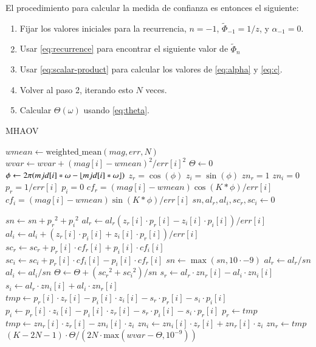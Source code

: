 El procedimiento para calcular la medida de confianza es entonces el siguiente:
\begin{enumerate}
    \item Fijar los valores iniciales para la recurrencia, $n=-1$, $\tilde{\Phi}_{-1} = 1/z$, y $\alpha_{-1}=0$.
    \item Usar \eqref{eq:recurrence} para encontrar el siguiente valor de $\tilde{\Phi}_n$
    \item Usar \eqref{eq:scalar-product} para calcular los valores de \eqref{eq:alpha} y \eqref{eq:c}.
    \item Volver al paso 2, iterando esto $N$ veces.
    \item Calcular $\Theta(\omega)$ usando \ref{eq:theta}.
\end{enumerate}
    
\begin{algorithm}[H]
\caption{MHAOV}\label{alg:mhaov}
\begin{algorithmic}
    \State $wmean \gets \text{weighted\_mean}(mag, err, N)$ 
\State $wvar \gets wvar + (mag[i] - wmean)^{2}/err[i]^{2}$ 
\EndFor
\State $\Theta \gets 0$
    \State $\phi \gets 2 \pi (mjd[i]*\omega - \lfloor mjd[i]*\omega\rfloor)$
    \State $z_r = \cos(\phi)$ 
    \State $z_i = \sin(\phi)$ 
    \State $zn_r = 1$ 
    \State $zn_i = 0$
    \State $p_r = 1/err[i]$
    \State $p_i = 0$
    \State $cf_r = (mag[i] - wmean)\cos(K * \phi) / err[i]$
    \State $cf_i = (mag[i] - wmean)\sin(K * \phi) / err[i]$
\EndFor
{}
    \State $sn, al_r, al_i, sc_r, sc_i \gets 0$

    \State $sn \gets sn + {p_r}^{2}+ {p_i}^{2}  $
    \State $al_r \gets al_r (z_r[i] \cdot  p_r[i] - z_i[i] \cdot  p_i[i])/err[i]$ 
        \State $al_i \gets al_i + ( z_r[i] \cdot  p_i[i] + z_i[i] \cdot  p_r[i])/err[i]$
        \State $sc_r \gets sc_r + p_r[i] \cdot  cf_r[i] + p_i[i] \cdot  cf_i[i]$ 
        \State $sc_i \gets sc_i + p_r[i] \cdot  cf_i[i] - p_i[i] \cdot  cf_r[i]$
    \EndFor
    \State $sn \gets \max(sn, 10\cdot {-9})$
    \State $al_r \gets al_r/sn$
    \State $al_i \gets al_i/sn$
    \State $\Theta \gets \Theta + ({sc_r}^{2} + {sc_i}^{2})/sn$
        \State $s_r \gets al_r \cdot zn_r[i] - al_i \cdot zn_i[i]$
        \State $s_i \gets al_r \cdot zn_i[i] + al_i \cdot zn_r[i]$
        \State $tmp \gets p_r[i]\cdot z_r[i] - p_i[i]\cdot z_i[i] - s_r\cdot p_r[i] - s_i\cdot p_i[i]$
        \State $p_i \gets p_r[i]\cdot z_i[i] - p_i[i]\cdot z_r[i] - s_r\cdot p_i[i] - s_i\cdot p_r[i]$ 
        \State $p_r \gets tmp$
        \State $tmp \gets zn_r[i] \cdot z_r[i] - zn_i[i] \cdot z_i$
        \State $zn_i \gets zn_i[i] \cdot z_r[i] + zn_r[i] \cdot z_i$ 
        \State $zn_r \gets tmp$
    \EndFor
\EndFor
\State \Return $(K-2N-1)\cdot \Theta / (2N\cdot \text{max}(wvar - \Theta, 10^{-9}))$


\end{algorithmic}
\end{algorithm}
